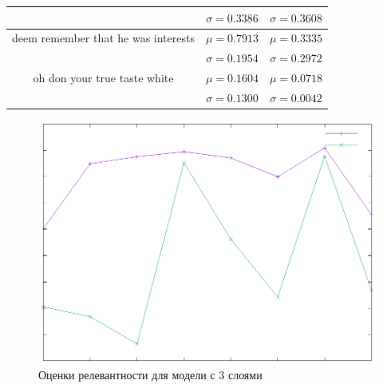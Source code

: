 \begin{table}[tbp]
\begin{center}
\begin{tabular}{ccc}
                                                      & \(\sigma=0.3386\)                                 & \(\sigma=0.3608\)           \\
            \midrule
            deem  remember that he was interests      & \(\mu=0.7913\)                                    & \(\mu=0.3335\)              \\
                                                      & \(\sigma=0.1954\)                                 & \(\sigma=0.2972\)           \\
            \midrule
            oh don  your true taste white             & \(\mu=0.1604\)                                    & \(\mu=0.0718\)              \\
                                                      & \(\sigma=0.1300\)                                 & \(\sigma=0.0042\)           \\
            \bottomrule
        \end{tabular}\label{tab3}
    \end{center}
\end{table}

\begin{figure}
    \centerline{\includegraphics[scale=0.8]{312-1_scores.eps}}
    \caption{Оценки релевантности для модели с 3 слоями}\label{fig:wn-scores-1}
\end{figure}

